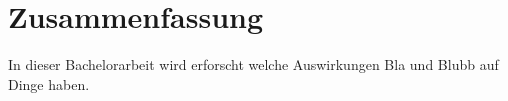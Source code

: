 
\chapter*{Zusammenfassung}

In dieser Bachelorarbeit wird erforscht welche Auswirkungen Bla und Blubb auf Dinge haben.